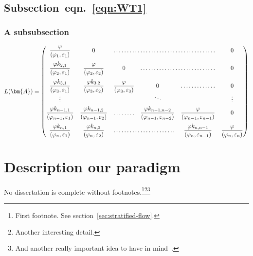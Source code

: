 \lipsum[4]

\subsection{Subsection~eqn.~\eqref{eqn:WT1}}
\lipsum[5-6]

\subsubsection{A subsubsection}
\lipsum[7]

\begin{equation}\label{eqn:WT1}
L(\ifpdftex\bm{A}\else\symbfup{A}\fi) = \begin{pmatrix}
\dfrac\varphi{(\varphi_1,\varepsilon_1)}			& 0 												 & \hdotsfor{3} 							& 0 \\[4\jot]
\dfrac{\varphi k_{2,1}}{(\varphi_2,\varepsilon_1)}	& \dfrac\varphi{(\varphi_2,\varepsilon_2)}			 & 0 										& \hdotsfor{2} & 0 \\[4\jot]
\dfrac{\varphi k_{3,1}}{(\varphi_3,\varepsilon_1)}	& \dfrac{\varphi k_{3,2}}{(\varphi_3,\varepsilon_2)} & \dfrac\varphi{(\varphi_3,\varepsilon_3)}	& 0 & \hdotsfor{1} & 0 \\[\jot]
\vdots 												&  													 &  & \smash{\rotatebox{15}{$\ddots$}} &  & \vdots \\[\jot]
\dfrac{\varphi k_{n-1, 1}}{(\varphi_{n-1},\varepsilon_1)}		& \dfrac{\varphi k_{n-1, 2}}{(\varphi_{n-1},\varepsilon_2)} & \hdotsfor{1} & 
	\dfrac{\varphi k_{n-1,n-2}}{(\varphi_{n-1},\varepsilon_{n-2})}	& \dfrac{\varphi}{(\varphi_{n-1},\varepsilon_{n-1})} 		& 0 \\[4\jot]
\dfrac{\varphi k_{n,1}}{(\varphi_n,\varepsilon_1)}				& \dfrac{\varphi k_{n,2}}{(\varphi_n,\varepsilon_2)}		& \hdotsfor{2}	&
	\dfrac{\varphi k_{n,n-1}}{(\varphi_n,\varepsilon_{n-1})} 		& \dfrac{\varphi}{(\varphi_n,\varepsilon_n)}
\end{pmatrix}
\end{equation}

\section{Description our paradigm}\label{ch1:theidea}

\lipsum[8] No dissertation is complete without footnotes.\footnote{First footnote. See section~\ref{sec:stratified-flow}.}\footnote{Another interesting detail.}\footnote{And another really important idea to have in mind~\cite{reynolds1958,clauser56,lienhard2020,johnson1980,johnson1965,mpl}.} 

